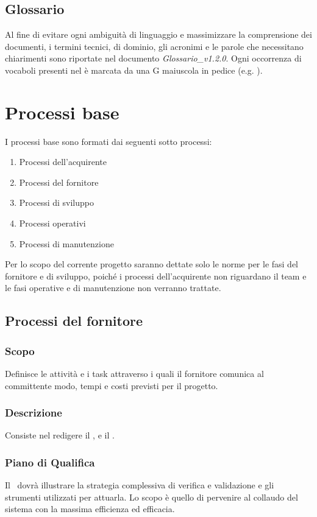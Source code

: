 \documentclass[12pt,a4paper]{article}
\begin{document}
\subsection{Glossario}
Al fine di evitare ogni ambiguità di linguaggio e massimizzare la comprensione dei
documenti, i termini tecnici, di dominio, gli acronimi e le parole che necessitano chiarimenti sono riportate nel documento \emph{Glossario\_v1.2.0}. Ogni occorrenza di vocaboli presenti nel \GlO è marcata da una G maiuscola in pedice (e.g. ).

\newpage

\section{Processi base} %
I processi base sono formati dai seguenti sotto processi:
\begin{enumerate}
\item Processi dell'acquirente
\item Processi del fornitore
\item Processi di sviluppo
\item Processi operativi
\item Processi di manutenzione
\end{enumerate}
Per lo scopo del corrente progetto saranno dettate solo le norme per le fasi del fornitore e di sviluppo, poiché i processi  dell'acquirente non riguardano il team e le fasi operative e di manutenzione non verranno trattate.

\subsection{Processi del fornitore}

\subsubsection{Scopo}
Definisce le attività e i task attraverso i quali il fornitore comunica al committente modo, tempi e costi previsti per il progetto.

\subsubsection{Descrizione}
Consiste nel redigere il \PdQ,  e il \PdP.

\subsubsection{Piano di Qualifica}
Il \PdQ\ dovrà illustrare la strategia complessiva di verifica e validazione e gli strumenti utilizzati per attuarla. Lo scopo è quello di pervenire al collaudo del sistema con la massima efficienza ed efficacia.
\end{document}
